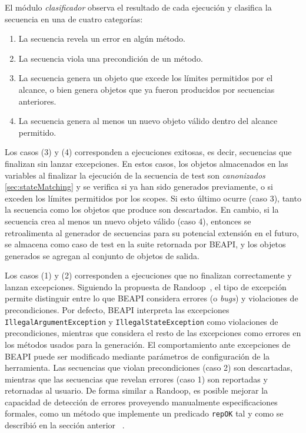 El módulo \emph{clasificador} observa el resultado de cada ejecución y clasifica 
la secuencia en una de cuatro categorías:
\begin{enumerate}
    \item La secuencia revela un error en algún método.
    \item La secuencia viola una precondición de un método.
    \item La secuencia genera un objeto que excede los límites permitidos por el alcance, o bien genera objetos que ya fueron producidos por secuencias anteriores.
    \item La secuencia genera al menos un nuevo objeto válido dentro del alcance permitido.
\end{enumerate}

Los casos (3) y (4) corresponden a ejecuciones exitosas, es decir, secuencias que finalizan sin lanzar excepciones. 
En estos casos, los objetos almacenados en las variables al finalizar la
ejecución de la secuencia de test son \emph{canonizados} \ref{sec:stateMatching}
y se verifica si ya han sido generados previamente, o si exceden los límites
permitidos por los scopes. 
Si esto último ocurre (caso 3), tanto la secuencia como los objetos que produce son descartados. 
En cambio, si la secuencia crea al menos un nuevo objeto válido (caso 4), 
entonces se retroalimenta al generador de secuencias para su potencial extensión
en el futuro, 
se almacena como caso de test en la suite retornada por BEAPI,
y los objetos generados se agregan al conjunto de objetos de salida.

Los casos (1) y (2) corresponden a ejecuciones que no finalizan correctamente y lanzan excepciones. 
Siguiendo la propuesta de Randoop~\cite{Pacheco07}, el tipo de excepción permite distinguir entre lo que BEAPI considera errores (o \emph{bugs}) 
y violaciones de precondiciones. 
Por defecto, BEAPI interpreta las excepciones \texttt{IllegalArgumentException} y \texttt{IllegalStateException} como violaciones de precondiciones, mientras que considera el resto de las
excepciones como errores en los métodos usados para la generación.
El comportamiento ante excepciones de BEAPI puede ser modificado mediante
parámetros de configuración de la herramienta. 
Las secuencias que violan precondiciones (caso 2) son descartadas, 
mientras que las secuencias que revelan errores (caso 1) 
son reportadas y retornadas al usuario. De forma similar a Randoop, 
es posible mejorar la capacidad de detección de errores proveyendo manualmente
especificaciones formales, como un método que implemente un predicado
\texttt{repOK} tal y como se describió en la sección anterior ~\cite{Pacheco07}.


